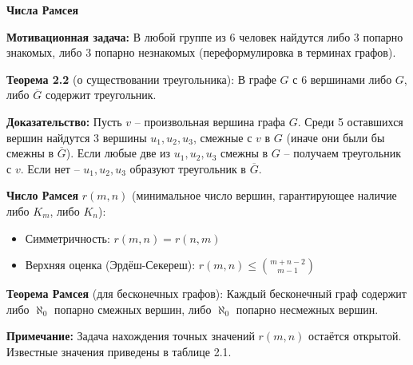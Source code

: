 \textbf{Числа Рамсея}

\noindent\textbf{Мотивационная задача:} В любой группе из 6 человек найдутся либо 3 попарно знакомых, либо 3 попарно незнакомых (переформулировка в терминах графов).

\noindent\textbf{Теорема 2.2} (о существовании треугольника): В графе $G$ с 6 вершинами либо $G$, либо $\overline{G}$ содержит треугольник.

\noindent\textbf{Доказательство:} 
Пусть $v$ -- произвольная вершина графа $G$. Среди 5 оставшихся вершин найдутся 3 вершины $u_1, u_2, u_3$, смежные с $v$ в $G$ (иначе они были бы смежны в $\overline{G}$). Если любые две из $u_1, u_2, u_3$ смежны в $G$ -- получаем треугольник с $v$. Если нет -- $u_1, u_2, u_3$ образуют треугольник в $\overline{G}$.

\noindent\textbf{Число Рамсея} $r(m,n)$ (минимальное число вершин, гарантирующее наличие либо $K_m$, либо $K_n$):
\begin{itemize}
\item Симметричность: $r(m,n) = r(n,m)$
\item Верхняя оценка (Эрдёш-Секереш): $r(m,n) \leq \binom{m + n - 2}{m - 1}$
\end{itemize}

\noindent\textbf{Теорема Рамсея} (для бесконечных графов): Каждый бесконечный граф содержит либо $\aleph_0$ попарно смежных вершин, либо $\aleph_0$ попарно несмежных вершин.

\noindent\textbf{Примечание:} Задача нахождения точных значений $r(m,n)$ остаётся открытой. Известные значения приведены в таблице 2.1.